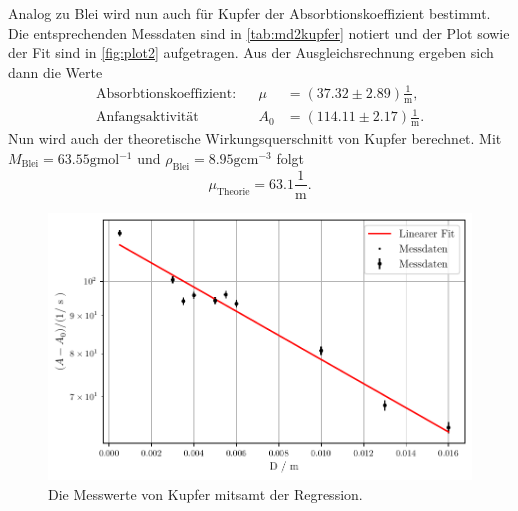 Analog zu Blei wird nun auch für Kupfer der Absorbtionskoeffizient bestimmt.
Die entsprechenden Messdaten sind in \autoref{tab:md2kupfer} notiert und der Plot sowie der Fit sind in \autoref{fig:plot2} aufgetragen.
Aus der Ausgleichsrechnung ergeben sich dann die Werte
\begin{align*}
    \text{Absorbtionskoeffizient:} && \mu &= (37.32 \pm 2.89) \frac{1}{\unit\meter},\\
    \text{Anfangsaktivität} && A_0 &= (114.11 \pm 2.17) \frac{1}{\unit\meter}.
\end{align*} 
Nun wird auch der theoretische Wirkungsquerschnitt von Kupfer berechnet.
Mit $M_\text{Blei} = 63.55 \unit{\gram\mol^{-1}}$ \cite{molaremasse} und $ \rho_\text{Blei} = 8.95 \unit{\gram\centi\meter^{-3}}$ folgt
\begin{equation}
    \mu_\text{Theorie} = 63.1 \frac{1}{\unit\meter}.
\end{equation}


\begin{figure}
    \centering
    \includegraphics[width=0.7 \linewidth]{build/plot2.pdf}
    \caption{Die Messwerte von Kupfer mitsamt der Regression.}
    \label{fig:plot2}
\end{figure}

